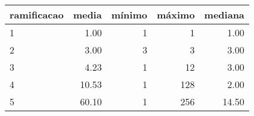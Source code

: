 \begin{table}[ht]
\centering
\begin{tabular}{lrrrr}
  \hline
ramificacao & media & mínimo & máximo & mediana \\ 
  \hline
1 & 1.00 &   1 &   1 & 1.00 \\ 
  2 & 3.00 &   3 &   3 & 3.00 \\ 
  3 & 4.23 &   1 &  12 & 3.00 \\ 
  4 & 10.53 &   1 & 128 & 2.00 \\ 
  5 & 60.10 &   1 & 256 & 14.50 \\ 
   \hline
\end{tabular}
\end{table}
